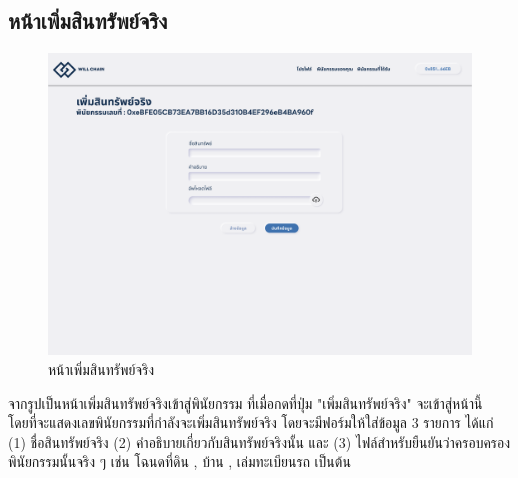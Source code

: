 \documentclass[12pt,oneside,openright,a4paper]{cpe-thai-project}
\begin{document}
\subsection{หน้าเพิ่มสินทรัพย์จริง}
		\begin{figure}[!thb]
			\centering
			\includegraphics[scale=0.2]{addRealAsset}
			\caption{หน้าเพิ่มสินทรัพย์จริง}
		\end{figure}
		\FloatBarrier
		\tab จากรูปเป็นหน้าเพิ่มสินทรัพย์จริงเข้าสู่พินัยกรรม ที่เมื่อกดที่ปุ่ม "เพิ่มสินทรัพย์จริง" จะเข้าสู่หน้านี้ โดยที่จะแสดงเลขพินัยกรรมที่กำลังจะเพิ่มสินทรัพย์จริง โดยจะมีฟอร์มให้ใส่ข้อมูล 3 รายการ ได้แก่ (1) ชื่อสินทรัพย์จริง (2) คำอธิบายเกี่ยวกับสินทรัพย์จริงนั้น และ (3) ไฟล์สำหรับยืนยันว่าครอบครองพินัยกรรมนั้นจริง ๆ เช่น โฉนดที่ดิน , บ้าน , เล่มทะเบียนรถ เป็นต้น
		
\clearpage
\end{document}
